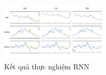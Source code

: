 \begin{figure}[H]
\centerline{\includegraphics[width=0.45\textwidth]{img/RNN_result.png}}
\caption{Kết quả thực nghiệm RNN}
\label{fig}
\end{figure}